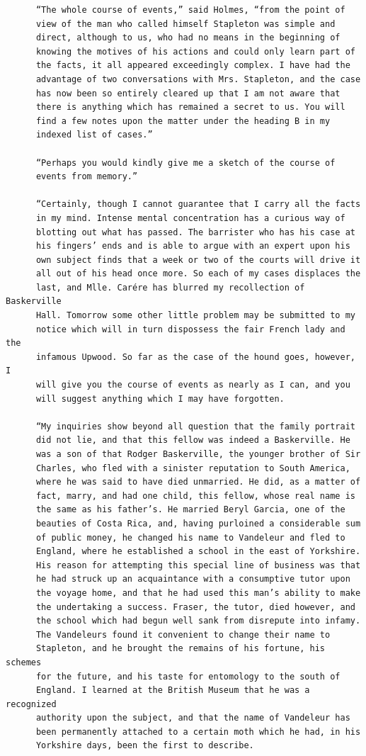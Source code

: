 \documentclass{article}
\begin{document}
\begin{verbatim}
      “The whole course of events,” said Holmes, “from the point of
      view of the man who called himself Stapleton was simple and
      direct, although to us, who had no means in the beginning of
      knowing the motives of his actions and could only learn part of
      the facts, it all appeared exceedingly complex. I have had the
      advantage of two conversations with Mrs. Stapleton, and the case
      has now been so entirely cleared up that I am not aware that
      there is anything which has remained a secret to us. You will
      find a few notes upon the matter under the heading B in my
      indexed list of cases.”

      “Perhaps you would kindly give me a sketch of the course of
      events from memory.”

      “Certainly, though I cannot guarantee that I carry all the facts
      in my mind. Intense mental concentration has a curious way of
      blotting out what has passed. The barrister who has his case at
      his fingers’ ends and is able to argue with an expert upon his
      own subject finds that a week or two of the courts will drive it
      all out of his head once more. So each of my cases displaces the
      last, and Mlle. Carére has blurred my recollection of Baskerville
      Hall. Tomorrow some other little problem may be submitted to my
      notice which will in turn dispossess the fair French lady and the
      infamous Upwood. So far as the case of the hound goes, however, I
      will give you the course of events as nearly as I can, and you
      will suggest anything which I may have forgotten.

      “My inquiries show beyond all question that the family portrait
      did not lie, and that this fellow was indeed a Baskerville. He
      was a son of that Rodger Baskerville, the younger brother of Sir
      Charles, who fled with a sinister reputation to South America,
      where he was said to have died unmarried. He did, as a matter of
      fact, marry, and had one child, this fellow, whose real name is
      the same as his father’s. He married Beryl Garcia, one of the
      beauties of Costa Rica, and, having purloined a considerable sum
      of public money, he changed his name to Vandeleur and fled to
      England, where he established a school in the east of Yorkshire.
      His reason for attempting this special line of business was that
      he had struck up an acquaintance with a consumptive tutor upon
      the voyage home, and that he had used this man’s ability to make
      the undertaking a success. Fraser, the tutor, died however, and
      the school which had begun well sank from disrepute into infamy.
      The Vandeleurs found it convenient to change their name to
      Stapleton, and he brought the remains of his fortune, his schemes
      for the future, and his taste for entomology to the south of
      England. I learned at the British Museum that he was a recognized
      authority upon the subject, and that the name of Vandeleur has
      been permanently attached to a certain moth which he had, in his
      Yorkshire days, been the first to describe.


\end{verbatim}
\end{document}
